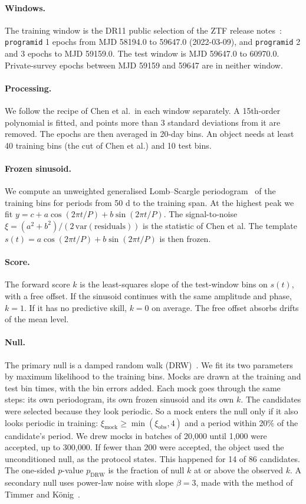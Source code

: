 \documentclass[11pt]{article}
\begin{document}
\paragraph{Windows.} The training window is the DR11 public selection of the ZTF release notes~\cite{dr11notes}: \texttt{programid} 1 epochs from MJD 58194.0 to 59647.0 (2022-03-09), and \texttt{programid} 2 and 3 epochs to MJD 59159.0. The test window is MJD 59647.0 to 60970.0. Private-survey epochs between MJD 59159 and 59647 are in neither window.

\paragraph{Processing.} We follow the recipe of Chen et al.\ in each window separately. A 15th-order polynomial is fitted, and points more than 3 standard deviations from it are removed. The epochs are then averaged in 20-day bins. An object needs at least 40 training bins (the cut of Chen et al.) and 10 test bins.

\paragraph{Frozen sinusoid.} We compute an unweighted generalised Lomb--Scargle periodogram~\cite{zechmeister2009} of the training bins for periods from 50 d to the training span. At the highest peak we fit $y=c+a\cos(2\pi t/P)+b\sin(2\pi t/P)$. The signal-to-noise $\xi=(a^2+b^2)/(2\,\mathrm{var}(\text{residuals}))$ is the statistic of Chen et al. The template $s(t)=a\cos(2\pi t/P)+b\sin(2\pi t/P)$ is then frozen.

\paragraph{Score.} The forward score $k$ is the least-squares slope of the test-window bins on $s(t)$, with a free offset. If the sinusoid continues with the same amplitude and phase, $k=1$. If it has no predictive skill, $k=0$ on average. The free offset absorbs drifts of the mean level.

\paragraph{Null.} The primary null is a damped random walk (DRW)~\cite{kelly2009}. We fit its two parameters by maximum likelihood to the training bins. Mocks are drawn at the training and test bin times, with the bin errors added. Each mock goes through the same steps: its own periodogram, its own frozen sinusoid and its own $k$. The candidates were selected because they look periodic. So a mock enters the null only if it also looks periodic in training: $\xi_\text{mock}\ge\min(\xi_\text{obs},4)$ and a period within 20\% of the candidate's period. We drew mocks in batches of 20,000 until 1,000 were accepted, up to 300,000. If fewer than 200 were accepted, the object used the unconditioned null, as the protocol states. This happened for 14 of 86 candidates. The one-sided $p$-value $p_\text{DRW}$ is the fraction of null $k$ at or above the observed $k$. A secondary null uses power-law noise with slope $\beta=3$, made with the method of Timmer and K\"onig~\cite{timmer1995}.
\end{document}
